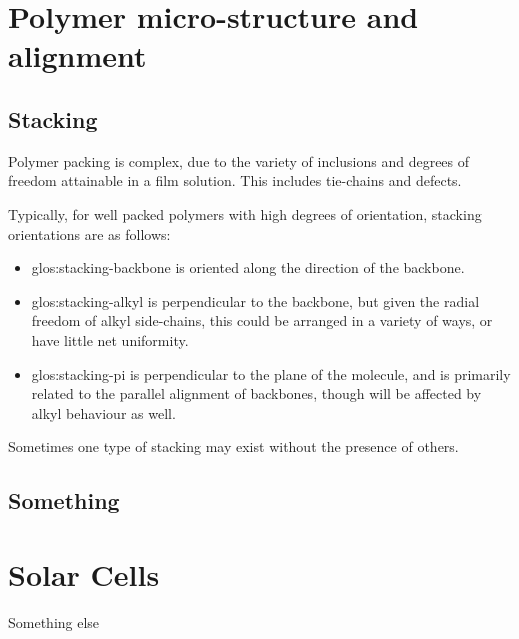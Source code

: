 \documentclass[../main.tex]{subfiles}
\begin{document}
		\section{Polymer micro-structure and alignment}\label{sec:ch2-alignment}
			\subsection{Stacking}
				Polymer packing is complex, due to the variety of inclusions and degrees of freedom attainable in a film solution. This includes tie-chains and defects.
				
				Typically, for well packed polymers with high degrees of orientation, stacking orientations are as follows:
				\begin{itemize}
					\item \gls{glos:stacking-backbone} is oriented along the direction of the backbone.
					\item \gls{glos:stacking-alkyl} is perpendicular to the backbone, but given the radial freedom of alkyl side-chains, this could be arranged in a variety of ways, or have little net uniformity.
					\item \gls{glos:stacking-pi} is perpendicular to the plane of the molecule, and is primarily related to the parallel alignment of backbones, though will be affected by alkyl behaviour as well.
				\end{itemize}
				Sometimes one type of stacking may exist without the presence of others.
				
			\subsection{Something}
		
			
		\section{Solar Cells}\label{sec:ch2-solar-cells}
			Something else

\ifSubfilesClassLoaded{
	\printbibliography{}
	\printglossaries
}{} %
	
\end{document}
